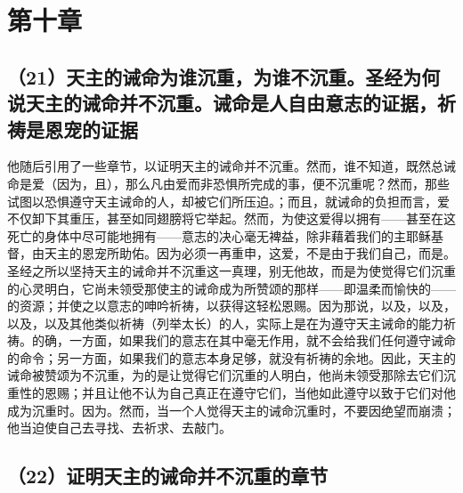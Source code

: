 
\section{第十章}


\subsection{（21）天主的诫命为谁沉重，为谁不沉重。圣经为何说天主的诫命并不沉重。诫命是人自由意志的证据，祈祷是恩宠的证据}

他随后引用了一些章节，以证明天主的诫命并不沉重。然而，谁不知道，既然总诫命是爱（因为，且），那么凡由爱而非恐惧所完成的事，便不沉重呢？然而，那些试图以恐惧遵守天主诫命的人，却被它们所压迫。；而且，就诫命的负担而言，爱不仅卸下其重压，甚至如同翅膀将它举起。然而，为使这爱得以拥有——甚至在这死亡的身体中尽可能地拥有——意志的决心毫无裨益，除非藉着我们的主耶稣基督，由天主的恩宠所助佑。因为必须一再重申，这爱，不是由于我们自己，而是。圣经之所以坚持天主的诫命并不沉重这一真理，别无他故，而是为使觉得它们沉重的心灵明白，它尚未领受那使主的诫命成为所赞颂的那样——即温柔而愉快的——的资源；并使之以意志的呻吟祈祷，以获得这轻松恩赐。因为那说，以及，以及，以及，以及其他类似祈祷（列举太长）的人，实际上是在为遵守天主诫命的能力祈祷。的确，一方面，如果我们的意志在其中毫无作用，就不会给我们任何遵守诫命的命令；另一方面，如果我们的意志本身足够，就没有祈祷的余地。因此，天主的诫命被赞颂为不沉重，为的是让觉得它们沉重的人明白，他尚未领受那除去它们沉重性的恩赐；并且让他不认为自己真正在遵守它们，当他如此遵守以致于它们对他成为沉重时。因为。然而，当一个人觉得天主的诫命沉重时，不要因绝望而崩溃；他当迫使自己去寻找、去祈求、去敲门。\par


\subsection{（22）证明天主的诫命并不沉重的章节}

